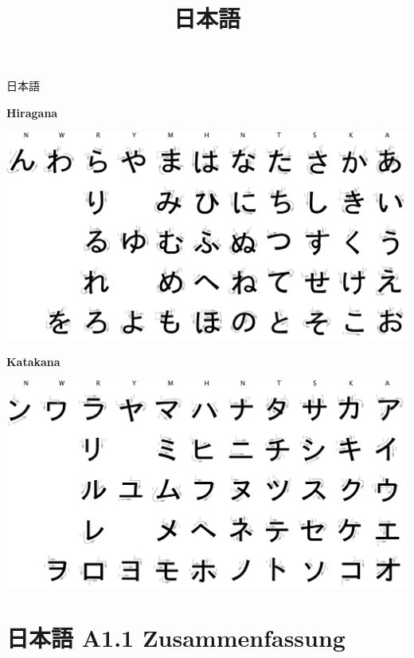 \documentclass[11pt,ngerman]{article}
\title{日本語}
\author{}
\date{}
\begin{document}

\begin{center}
    \Huge 日本語
\end{center}

\vfill

\begin{center}
    \textbf{Hiragana}
\end{center}

\includegraphics[width=\textwidth]{hiragana.pdf}

\bigskip
\bigskip

\begin{center}
    \textbf{Katakana}
\end{center}

\includegraphics[width=\textwidth]{katakana.pdf}

\vfill

\newpage


\section*{日本語 A1.1 Zusammenfassung}
\end{document}
